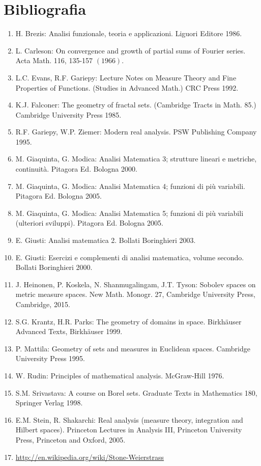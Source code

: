 \documentclass{book}
\begin{document}
\chapter*{Bibliografia}
\begin{enumerate}[label={\lbrack\arabic*\rbrack}]
  \item H. Brezis: Analisi funzionale, teoria e applicazioni. Liguori Editore 1986.
  \item L. Carleson: On convergence and growth of partial sums of Fourier series. Acta Math. 116, 135-157 $(1966)$.
  \item L.C. Evans, R.F. Gariepy: Lecture Notes on Measure Theory and Fine Properties of Functions. (Studies in Advanced Math.) CRC Press 1992.
  \item K.J. Falconer: The geometry of fractal sets. (Cambridge Tracts in Math. 85.) Cambridge University Press 1985.
  \item R.F. Gariepy, W.P. Ziemer: Modern real analysis. PSW Publishing Company 1995.
  \item M. Giaquinta, G. Modica: Analisi Matematica 3; strutture lineari e metriche, continuità. Pitagora Ed. Bologna 2000.
  \item M. Giaquinta, G. Modica: Analisi Matematica 4; funzioni di più variabili. Pitagora Ed. Bologna 2005.
  \item M. Giaquinta, G. Modica: Analisi Matematica 5; funzioni di più variabili (ulteriori sviluppi). Pitagora Ed. Bologna 2005.
  \item E. Giusti: Analisi matematica 2. Bollati Boringhieri 2003.
  \item E. Giusti: Esercizi e complementi di analisi matematica, volume secondo. Bollati Boringhieri 2000.
  \item J. Heinonen, P. Koskela, N. Shanmugalingam, J.T. Tyson: Sobolev spaces on metric measure spaces. New Math. Monogr. 27, Cambridge University Press, Cambridge, 2015.
  \item S.G. Krantz, H.R. Parks: The geometry of domains in space. Birkhäuser Advanced Texts, Birkhäuser 1999.
  \item P. Mattila: Geometry of sets and measures in Euclidean spaces. Cambridge University Press 1995.
  \item W. Rudin: Principles of mathematical analysis. McGraw-Hill 1976.
  \item S.M. Srivastava: A course on Borel sets. Graduate Texts in Mathematics 180, Springer Verlag 1998.
  \item E.M. Stein, R. Shakarchi: Real analysis (measure theory, integration and Hilbert spaces). Princeton Lectures in Analysis III, Princeton University Press, Princeton and Oxford, 2005.
  \item \href{http://en.wikipedia.org/wiki/Stone-Weierstrass}{http://en.wikipedia.org/wiki/Stone-Weierstrass}
  
\end{enumerate}
\end{document}
